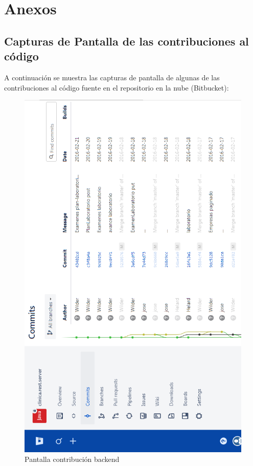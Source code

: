 \chapter{Anexos}	
		\section{Capturas de Pantalla de las contribuciones al código}
			A continuación se muestra las capturas de pantalla de algunas de las
			contribuciones al código fuente en el repositorio en la nube (Bitbucket):
			
			\begin{figure}[H]
			    \centering
				\includegraphics[width=13cm]{../imgs/ui/bitbucket-back.png}
				\caption{Pantalla contribución backend}
				\label{figure:bitbucket-back}
			\end{figure}
			
